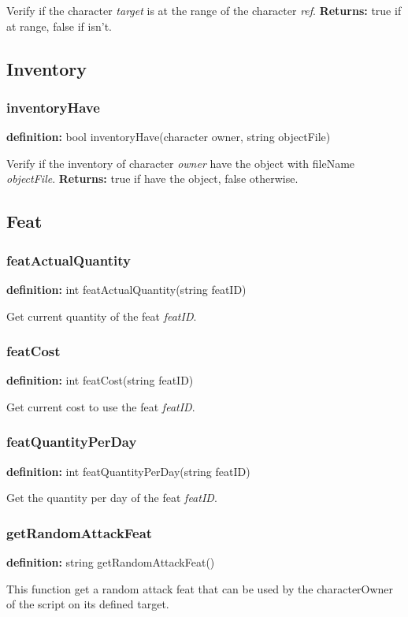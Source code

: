 \documentclass[ letterpaper,12pt]{article}
\begin{document}
Verify if the character {\it target} is at the range of the character {\it ref}.
{\bf Returns:} true if at range, false if isn't.


\subsection{Inventory}

\subsubsection{inventoryHave}
{\bf definition:} bool inventoryHave(character owner, string objectFile)

Verify if the inventory of character {\it owner} have the object with fileName
{\it objectFile}. {\bf Returns: } true if have the object, false otherwise.

\subsection{Feat}

\subsubsection{featActualQuantity}
{\bf definition:} int featActualQuantity(string featID)

Get current quantity of the feat {\it featID}.

\subsubsection{featCost}
{\bf definition:} int featCost(string featID)

Get current cost to use the feat {\it featID}.

\subsubsection{featQuantityPerDay}
{\bf definition:} int featQuantityPerDay(string featID)

Get the quantity per day of the feat {\it featID}.

\subsubsection{getRandomAttackFeat}
{\bf definition:} string getRandomAttackFeat()

This function get a random attack feat that can be used by
the characterOwner of the script on its defined target.
\end{document}
